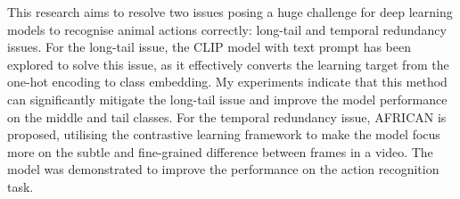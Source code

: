 This research aims to resolve two issues posing a huge challenge for deep learning models to recognise animal actions correctly: long-tail and temporal redundancy issues. For the long-tail issue, the CLIP model with text prompt has been explored to solve this issue, as it effectively converts the learning target from the one-hot encoding to class embedding. My experiments indicate that this method can significantly mitigate the long-tail issue and improve the model performance on the middle and tail classes. For the temporal redundancy issue, AFRICAN is proposed, utilising the contrastive learning framework to make the model focus more on the subtle and fine-grained difference between frames in a video. The model was demonstrated to improve the performance on the action recognition task.
